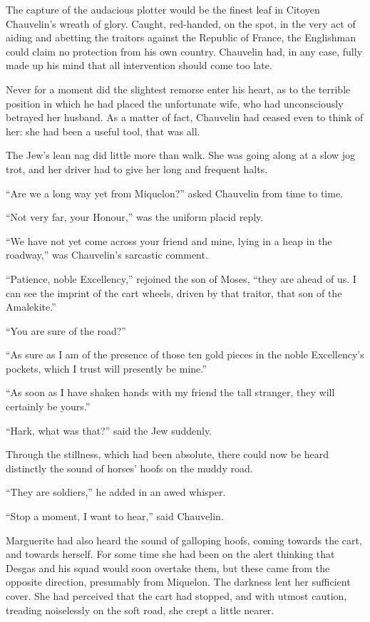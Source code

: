 The capture of the audacious plotter would be the finest leaf in Citoyen Chauvelin's wreath of glory. Caught, red-handed, on the spot, in the very act of aiding and abetting the traitors against the Republic of France, the Englishman could claim no protection from his own country. Chauvelin had, in any case, fully made up his mind that all intervention should come too late.

Never for a moment did the slightest remorse enter his heart, as to the terrible position in which he had placed the unfortunate wife, who had unconsciously betrayed her husband. As a matter of fact, Chauvelin had ceased even to think of her: she had been a useful tool, that was all.

The Jew's lean nag did little more than walk. She was going along at a slow jog trot, and her driver had to give her long and frequent halts.

\enquote{Are we a long way yet from Miquelon?} asked Chauvelin from time to time.

\enquote{Not very far, your Honour,} was the uniform placid reply.

\enquote{We have not yet come across your friend and mine, lying in a heap in the roadway,} was Chauvelin's sarcastic comment.

\enquote{Patience, noble Excellency,} rejoined the son of Moses, \enquote{they are ahead of us. I can see the imprint of the cart wheels, driven by that traitor, that son of the Amalekite.}

\enquote{You are sure of the road?}

\enquote{As sure as I am of the presence of those ten gold pieces in the noble Excellency's pockets, which I trust will presently be mine.}

\enquote{As soon as I have shaken hands with my friend the tall stranger, they will certainly be yours.}

\enquote{Hark, what was that?} said the Jew suddenly.

Through the stillness, which had been absolute, there could now be heard distinctly the sound of horses’ hoofs on the muddy road.

\enquote{They are soldiers,} he added in an awed whisper.

\enquote{Stop a moment, I want to hear,} said Chauvelin.

Marguerite had also heard the sound of galloping hoofs, coming towards the cart, and towards herself. For some time she had been on the alert thinking that Desgas and his squad would soon overtake them, but these came from the opposite direction, presumably from Miquelon. The darkness lent her sufficient cover. She had perceived that the cart had stopped, and with utmost caution, treading noiselessly on the soft road, she crept a little nearer.


